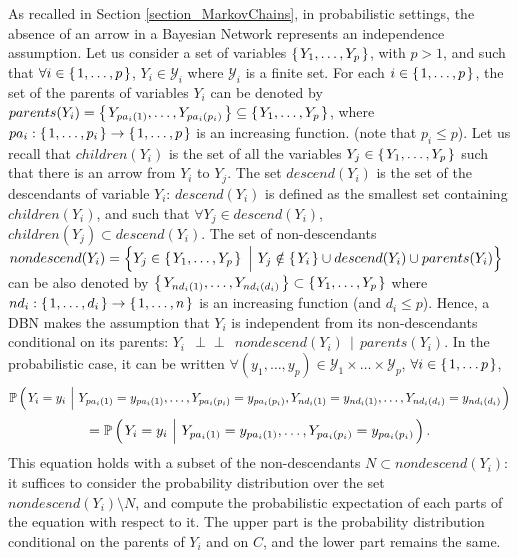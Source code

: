 As recalled in Section \ref{section_MarkovChains}, 
in probabilistic settings, 
the absence of an arrow in a Bayesian Network
represents an independence assumption. 
Let us consider a set of variables
$\left\{ \left. Y_1, \ldots, Y_p \right. \right\}$, with $p>1$, 
and such that 
$\forall i \in \left\{ \left. 1,\ldots,p \right. \right\}$, $Y_i \in \mathcal{Y}_i$ 
where $\mathcal{Y}_i$ is a finite set.
For each $i \in \left\{ \left. 1,\ldots,p \right. \right\}$, 
the set of the parents of variables $Y_i$
can be denoted by 
$parents(Y_i) = \left\{ \left.  Y_{pa_i(1)}, \ldots, Y_{pa_i(p_i)}  \right. \right\} \subseteq \left\{ \left.  Y_1,\ldots,Y_p  \right. \right\}$,
where $pa_i: \left\{ \left. 1,\ldots,p_i \right. \right\} \rightarrow \left\{ \left. 1,\ldots,p \right. \right\}$ is an increasing function.
(note that $p_i \leqslant p$).
Let us recall that $children(Y_i)$ is the set of all the variables $Y_j \in \left\{ \left.  Y_1,\ldots,Y_p  \right. \right\}$ 
such that there is an arrow from $Y_i$ to $Y_j$.
The set $descend(Y_i)$ is the set of the descendants of variable $Y_i$:
$descend(Y_i)$ is defined as the smallest set containing $children(Y_i)$,
and such that $\forall Y_j \in descend(Y_i)$, $children(Y_j) \subset descend(Y_i)$.
The set of non-descendants 
$nondescend(Y_i) = \Big\{ Y_j \in \left\{ \left.  Y_1,\ldots,Y_p  \right. \right\} \ \Big\vert \ Y_j \notin \left\{ \left. Y_i \right. \right\} \cup descend(Y_i) \cup parents(Y_i)  \Big\}$
can be also denoted by $\left\{ \left.  Y_{nd_i(1)}, \ldots, Y_{nd_i(d_i)}  \right. \right\} \subset \left\{ \left.  Y_1,\ldots,Y_p  \right. \right\}$
where $nd_i: \left\{ \left. 1,\ldots,d_i \right. \right\} \rightarrow \left\{ \left. 1,\ldots,n \right. \right\}$ is an increasing function (and $d_i \leqslant p$).
Hence, a DBN makes the assumption that
$Y_i$ is independent from its non-descendants conditional on its parents:
$Y_i \ \ \perp\!\!\!\perp \ \ nondescend(Y_i) \ \ \vert \ \ parents(Y_i)$.
In the probabilistic case, it can be written
$\forall (y_1,\ldots,y_p) \in \mathcal{Y}_1 \times \ldots \times \mathcal{Y}_p$,
$\forall i \in \left\{ \left. 1,\ldots p \right. \right\}$,
\[\mathbb{P} \paren{ Y_i=y_i \ \Big\vert \ Y_{pa_i(1)}=y_{pa_i(1)},\ldots, Y_{pa_i(p_i)}=y_{pa_i(p_i)}, Y_{nd_i(1)} = y_{nd_i(1)}, \ldots, Y_{nd_i(d_i)} = y_{nd_i(d_i)} }  \]
\begin{equation}
\label{DBNindep_prob} 
= \mathbb{P} \paren{ Y_i=y_i \ \Big\vert \ Y_{pa_i(1)}=y_{pa_i(1)},\ldots, Y_{pa_i(p_i)}=y_{pa_i(p_i)} }.
\end{equation}
This equation holds with a subset of the non-descendants $N \subset nondescend(Y_i)$: 
it suffices to consider the probability distribution 
over the set $nondescend(Y_i)\setminus N$, 
and compute the probabilistic expectation 
of each parts of the equation with respect to it.
The upper part is the probability distribution conditional on the parents of $Y_i$ and on $C$,
and the lower part remains the same.

